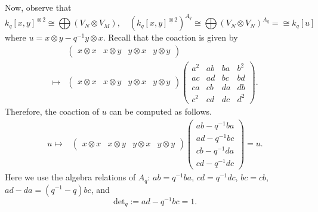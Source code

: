 Now, observe that
\[
    k_q[x,y]^{\underline{\otimes} 2} \cong \bigoplus (V_N \otimes V_M), \quad \left( k_q[x,y]^{\underline{\otimes} 2} \right)^{A_q} \cong \bigoplus (V_N \otimes V_N)^{A_q} = \cong k_q [u]
\]
where $u = x \otimes y - q^{-1} y \otimes x$.
Recall that the coaction is given by
\begin{align*}
    & \begin{pmatrix}
        x \otimes x & x \otimes y & y \otimes x & y \otimes y 
    \end{pmatrix}
    \\
    \longmapsto & \begin{pmatrix}
        x \otimes x & x \otimes y & y \otimes x & y \otimes y
    \end{pmatrix} 
    \begin{pmatrix}
        a^2 & ab & ba & b^2 \\
        ac & ad & bc & bd \\
        ca & cb & da & db \\
        c^2 & cd & dc & d^2
    \end{pmatrix}.
\end{align*}
Therefore, the coaction of $u$ can be computed as follows.
\begin{align*}
    u \mapsto & \begin{pmatrix}
        x \otimes x & x \otimes y & y \otimes x & y \otimes y 
    \end{pmatrix}
    \begin{pmatrix}
        ab - q^{-1} ba \\
        ad - q^{-1} bc \\
        cb - q^{-1} da \\
        cd - q^{-1} dc
    \end{pmatrix} = u.
\end{align*}
Here we use the algebra relations of $A_q$: $ab = q^{-1} ba$, $cd = q^{-1}dc$, $bc = cb$, $ad - da = (q^{-1} - q) bc$, and
\[
\mathrm{det}_q := ad - q^{-1}bc = 1.
\]